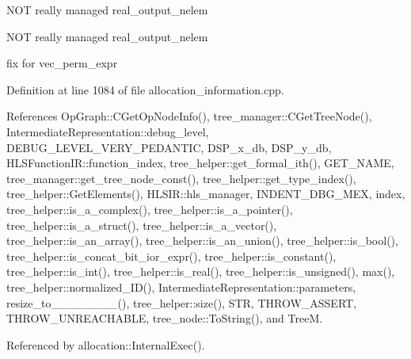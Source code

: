 N\+OT really managed real\+\_\+output\+\_\+nelem

N\+OT really managed real\+\_\+output\+\_\+nelem

fix for vec\+\_\+perm\+\_\+expr 

Definition at line 1084 of file allocation\+\_\+information.\+cpp.



References Op\+Graph\+::\+C\+Get\+Op\+Node\+Info(), tree\+\_\+manager\+::\+C\+Get\+Tree\+Node(), Intermediate\+Representation\+::debug\+\_\+level, D\+E\+B\+U\+G\+\_\+\+L\+E\+V\+E\+L\+\_\+\+V\+E\+R\+Y\+\_\+\+P\+E\+D\+A\+N\+T\+IC, D\+S\+P\+\_\+x\+\_\+db, D\+S\+P\+\_\+y\+\_\+db, H\+L\+S\+Function\+I\+R\+::function\+\_\+index, tree\+\_\+helper\+::get\+\_\+formal\+\_\+ith(), G\+E\+T\+\_\+\+N\+A\+ME, tree\+\_\+manager\+::get\+\_\+tree\+\_\+node\+\_\+const(), tree\+\_\+helper\+::get\+\_\+type\+\_\+index(), tree\+\_\+helper\+::\+Get\+Elements(), H\+L\+S\+I\+R\+::hls\+\_\+manager, I\+N\+D\+E\+N\+T\+\_\+\+D\+B\+G\+\_\+\+M\+EX, index, tree\+\_\+helper\+::is\+\_\+a\+\_\+complex(), tree\+\_\+helper\+::is\+\_\+a\+\_\+pointer(), tree\+\_\+helper\+::is\+\_\+a\+\_\+struct(), tree\+\_\+helper\+::is\+\_\+a\+\_\+vector(), tree\+\_\+helper\+::is\+\_\+an\+\_\+array(), tree\+\_\+helper\+::is\+\_\+an\+\_\+union(), tree\+\_\+helper\+::is\+\_\+bool(), tree\+\_\+helper\+::is\+\_\+concat\+\_\+bit\+\_\+ior\+\_\+expr(), tree\+\_\+helper\+::is\+\_\+constant(), tree\+\_\+helper\+::is\+\_\+int(), tree\+\_\+helper\+::is\+\_\+real(), tree\+\_\+helper\+::is\+\_\+unsigned(), max(), tree\+\_\+helper\+::normalized\+\_\+\+I\+D(), Intermediate\+Representation\+::parameters, resize\+\_\+to\+\_\+\_\+\_\+\_\+\_\+\_\+\_\+\_(), tree\+\_\+helper\+::size(), S\+TR, T\+H\+R\+O\+W\+\_\+\+A\+S\+S\+E\+RT, T\+H\+R\+O\+W\+\_\+\+U\+N\+R\+E\+A\+C\+H\+A\+B\+LE, tree\+\_\+node\+::\+To\+String(), and TreeM.



Referenced by allocation\+::\+Internal\+Exec().


